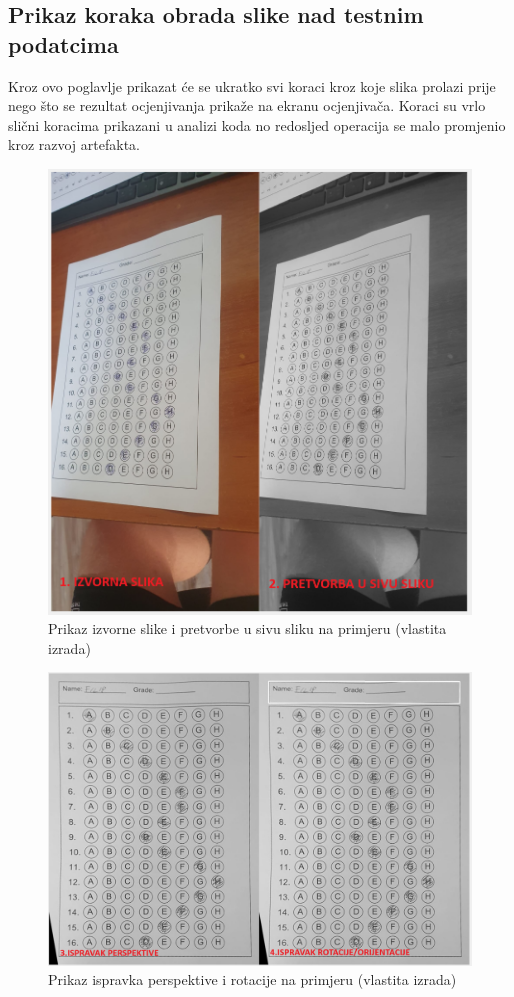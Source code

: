 \documentclass{foi}
\begin{document}
\subsection{Prikaz koraka obrada slike nad testnim podatcima}

Kroz ovo poglavlje prikazat će se ukratko svi koraci kroz koje slika prolazi prije nego što se rezultat ocjenjivanja prikaže na ekranu ocjenjivača. Koraci su vrlo slični koracima prikazani u analizi koda no redosljed operacija se malo promjenio kroz razvoj artefakta.

\begin{figure}[H]
\centering
\includegraphics[width=0.85\linewidth]{slike/null (7).png}
\caption{Prikaz izvorne slike i pretvorbe u sivu sliku na primjeru (vlastita izrada)}
\end{figure}

\begin{figure}[H]
\centering
\includegraphics[width=0.85\linewidth]{slike/null (8).png}
\caption{Prikaz ispravka perspektive i rotacije na primjeru (vlastita izrada)}
\end{figure}
\end{document}
